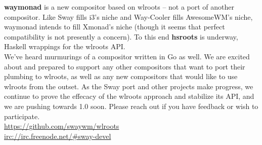 \documentclass{article}
\begin{document}
\textbf{waymonad} is a new compositor based on wlroots -- not a port of another
compositor. Like Sway fills i3's niche and Way-Cooler fills AwesomeWM's niche,
waymonad intends to fill Xmonad's niche (though it seems that perfect
compatibility is not presently a concern). To this end \textbf{hsroots} is
underway, Haskell wrappings for the wlroots API.\\

We've heard murmurings of a compositor written in Go as well. We are excited
about and prepared to support any other compositors that want to port their
plumbing to wlroots, as well as any new compositors that would like to use
wlroots from the outset. As the Sway port and other projects make progress, we
continue to prove the effecacy of the wlroots approach and stabilize its API,
and we are pushing towards 1.0 soon. Please reach out if you have feedback or
wish to participate.\\

\url{https://github.com/swaywm/wlroots}\\

\url{irc://irc.freenode.net/#sway-devel}
\end{document}
